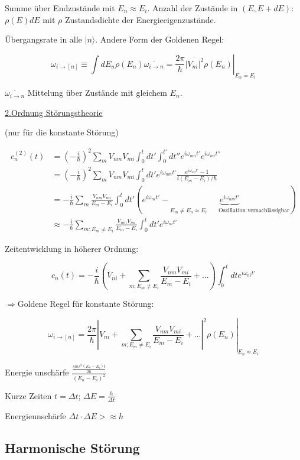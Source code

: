 Summe über Endzustände mit \(E_n \approx E_i\). Anzahl der Zustände in \((E,E+dE)\): \(\rho(E)dE\) mit \(\rho\) Zustandsdichte der Energieeigenzustände.

Übergangsrate in alle \(|n\rangle \). Andere Form der Goldenen Regel:

\[\boxed{\omega_{i\rightarrow [n]} \equiv \int dE_n\rho(E_n)\overline{\omega_{i\rightarrow n}} = \left. \frac{2\pi}{\hbar}\overline{|V_{ni}|^2}\rho(E_n)\right|_{E_n=E_i}}\]

\(\overline{\omega_{i\rightarrow n}}\) Mittelung über Zustände mit gleichem \(E_n\).




\underline{2.Ordnung Störungstheorie}

(nur für die konstante Störung)

\begin{align}
  c^{(2)}_n(t) &= (-\frac{i}{\hbar})^2 \sum_m V_{nm}V_{mi} \int_0^t dt'\int_0^{t'} dt''e^{i\omega_{nm}t'}e^{i\omega_{mi}t''}\\
  &= (-\frac{i}{\hbar})^2 \sum_m V_{nm}V_{mi} \int_0^t dt' e^{i\omega_{nm}t'} \frac{e^{i\omega_{mi}t'}-1}{i(E_m-E_i)/\hbar}\\
  &= -\frac{i}{\hbar}\sum_m \frac{ V_{nm}V_{mi} }{E_m-E_i} \int_0^t dt' (e^{i\omega_{ni}t'}-\underbrace{e^{i\omega_{nm}t'}}_{E_m\neq E_n\approx E_i\qquad\text{Oszillation vernachlässigbar}})\\
  &\approx -\frac{i}{\hbar}\sum_{m; E_m\neq E_i} \frac{ V_{nm}V_{mi} }{E_m-E_i} \int_0^t dt'e^{i\omega_{ni}t'}
\end{align}


Zeitentwicklung in höherer Ordnung:

\[ c_n(t) = -\frac{i}{\hbar} (V_{ni} +\sum_{m; E_m\neq E_i} \frac{ V_{nm}V_{mi} }{E_m-E_i} +...)\int_0^t dt e^{i\omega_{ni}t'} \]

\(\Rightarrow \)Goldene Regel für konstante Störung:

\[\omega_{i\rightarrow [n]} =\left. \frac{2\pi}{\hbar} |V_{ni} +\sum_{m; E_m\neq E_i} \frac{ V_{nm}V_{mi} }{E_m-E_i} +...|^2\rho(E_n)\right|_{E_n\approx E_i} \]

Energie unschärfe \(\frac{\frac{sins^2(E_n-E_i)t}{2\hbar}}{(E_n-E_i)^2}\)


Kurze Zeiten \(t=\Delta t\); \(\Delta E = \frac{h}{\Delta t}\)

Energieunschärfe \(\Delta t \cdot \Delta E >\approx h\)




\subsection{Harmonische Störung}


